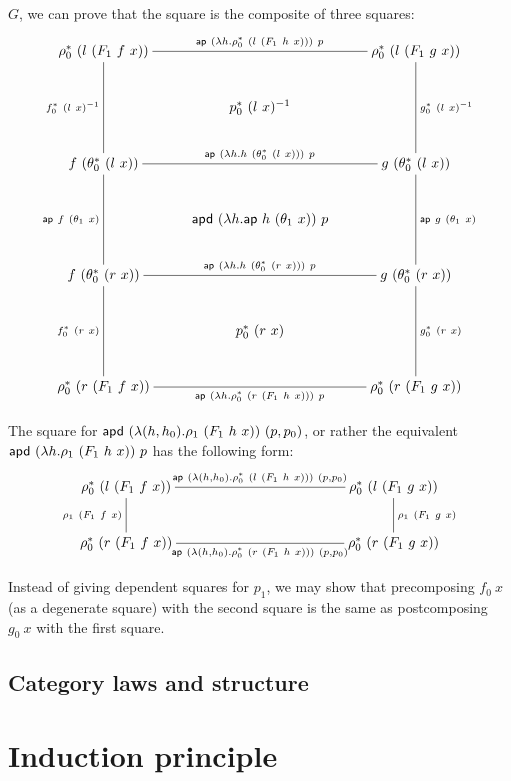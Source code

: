 \documentclass[a4paper,10pt]{report}
\begin{document}
$G$, we can prove that the square is the composite of three squares:
$$
\xymatrix{
\rho_0^*\ (l\ (F_1\ f\ x))
\ar@{-}[dd]_{f_0^*\ (l\ x)^{-1}}
\ar@{-}[rr]^{\ap\ (\lambda h . \rho_0^*\ (l\ (F_1\ h\ x)))\ p}
&&\rho_0^*\ (l\ (F_1\ g\ x))
\ar@{-}[dd]^{g_0^*\ (l\ x)^{-1}}
\\
&p_0^*\ (l\ x)^{-1}&
\\
f\ (\theta_0^*\ (l\ x))
\ar@{-}[dd]_{\ap\ f\ (\theta_1\ x)}
\ar@{-}[rr]^{\ap\ (\lambda h . h\ (\theta_0^*\ (l\ x)))\ p}
&&g\ (\theta_0^*\ (l\ x))
\ar@{-}[dd]^{\ap\ g\ (\theta_1\ x)}
\\
&\apd\ (\lambda h . \ap\ h\ (\theta_1\ x))\ p&
\\
f\ (\theta_0^*\ (r\ x))
\ar@{-}[dd]_{f_0^*\ (r\ x)}
\ar@{-}[rr]^{\ap\ (\lambda h . h\ (\theta_0^*\ (r\ x)))\ p}
&&g\ (\theta_0^*\ (r\ x))
\ar@{-}[dd]^{g_0^*\ (r\ x)}
\\
&p_0^*\ (r\ x)&
\\
\rho_0^*\ (r\ (F_1\ f\ x))
\ar@{-}[rr]_{\ap\ (\lambda h . \rho_0^*\ (r\ (F_1\ h\ x)))\ p}
&&\rho_0^*\ (r\ (F_1\ g\ x))
}
$$

The square for
$\mathsf{apd}\ (\lambda (h,h_0) . \rho_1\ (F_1\ h\ x))\ (p,p_0)$, or rather
the equivalent $\mathsf{apd}\ (\lambda h . \rho_1\ (F_1\ h\ x))\ p$ has the
following form:
$$
\xymatrixcolsep{10pc}
\xymatrix{
  \rho_0^*\ (l\ (F_1\ f\ x))
  \ar@{-}[d]_{\rho_1\ (F_1\ f\ x)}
  \ar@{-}[r]^{\ap\ (\lambda (h,h_0) . \rho_0^*\ (l\ (F_1\ h\ x)))\ (p,p_0)}
  &\rho_0^*\ (l\ (F_1\ g\ x)) 
  \\
  \rho_0^*\ (r\ (F_1\ f\ x))
  &\rho_0^*\ (r\ (F_1\ g\ x)) 
  \ar@{-}[l]^{\ap\ (\lambda (h,h_0) . \rho_0^*\ (r\ (F_1\ h\ x)))\ (p,p_0)}
  \ar@{-}[u]_{\rho_1\ (F_1\ g\ x)}
  \\
}
$$

Instead of giving dependent squares for $p_1$, we may show that
precomposing $f_0\ x$ (as a degenerate square) with the second square
is the same as postcomposing $g_0\ x$ with the first square.

\subsection{Category laws and structure}


\section{Induction principle}
\end{document}
